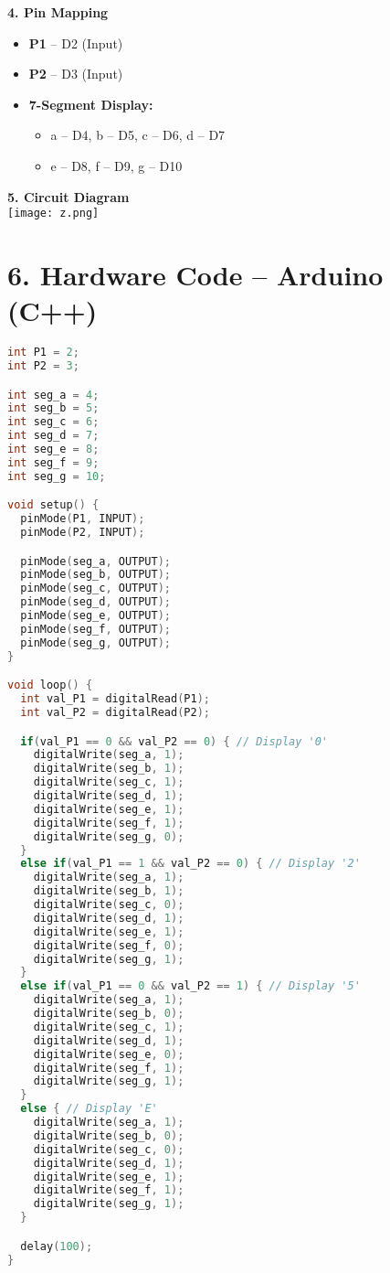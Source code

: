 \documentclass[12pt]{article}
\begin{document}
\begin{multicols}{2}
\vspace{1em}
\noindent\textbf{4. Pin Mapping}
\begin{itemize}
    \item \textbf{P1} – D2 (Input)
    \item \textbf{P2} – D3 (Input)
    \item \textbf{7-Segment Display:}
    \begin{itemize}
        \item a – D4, b – D5, c – D6, d – D7
        \item e – D8, f – D9, g – D10
    \end{itemize}
\end{itemize}

\vspace{1em}
\noindent\textbf{5. Circuit Diagram} \\
\texttt{[image: z.png]} %

\end{multicols}

\newpage
\section*{6. Hardware Code – Arduino (C++)}
\begin{lstlisting}[language=C++]
int P1 = 2;
int P2 = 3;

int seg_a = 4;
int seg_b = 5;
int seg_c = 6;
int seg_d = 7;
int seg_e = 8;
int seg_f = 9;
int seg_g = 10;

void setup() {
  pinMode(P1, INPUT);
  pinMode(P2, INPUT);

  pinMode(seg_a, OUTPUT);
  pinMode(seg_b, OUTPUT);
  pinMode(seg_c, OUTPUT);
  pinMode(seg_d, OUTPUT);
  pinMode(seg_e, OUTPUT);
  pinMode(seg_f, OUTPUT);
  pinMode(seg_g, OUTPUT);
}

void loop() {
  int val_P1 = digitalRead(P1);
  int val_P2 = digitalRead(P2);

  if(val_P1 == 0 && val_P2 == 0) { // Display '0'
    digitalWrite(seg_a, 1);
    digitalWrite(seg_b, 1);
    digitalWrite(seg_c, 1);
    digitalWrite(seg_d, 1);
    digitalWrite(seg_e, 1);
    digitalWrite(seg_f, 1);
    digitalWrite(seg_g, 0);
  }
  else if(val_P1 == 1 && val_P2 == 0) { // Display '2'
    digitalWrite(seg_a, 1);
    digitalWrite(seg_b, 1);
    digitalWrite(seg_c, 0);
    digitalWrite(seg_d, 1);
    digitalWrite(seg_e, 1);
    digitalWrite(seg_f, 0);
    digitalWrite(seg_g, 1);
  }
  else if(val_P1 == 0 && val_P2 == 1) { // Display '5'
    digitalWrite(seg_a, 1);
    digitalWrite(seg_b, 0);
    digitalWrite(seg_c, 1);
    digitalWrite(seg_d, 1);
    digitalWrite(seg_e, 0);
    digitalWrite(seg_f, 1);
    digitalWrite(seg_g, 1);
  }
  else { // Display 'E'
    digitalWrite(seg_a, 1);
    digitalWrite(seg_b, 0);
    digitalWrite(seg_c, 0);
    digitalWrite(seg_d, 1);
    digitalWrite(seg_e, 1);
    digitalWrite(seg_f, 1);
    digitalWrite(seg_g, 1);
  }

  delay(100);
}
\end{lstlisting}
\end{document}
